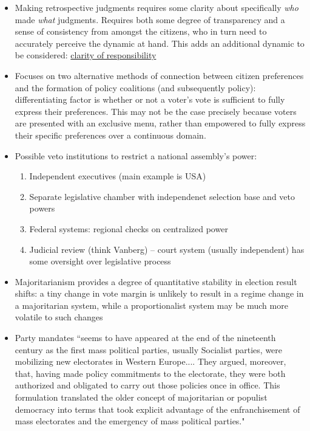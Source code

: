 \documentclass[12pt]{article}
\begin{document}
\begin{itemize}[leftmargin=*, itemsep=4pt]
    \item Making retrospective judgments requires some clarity about specifically \emph{who} made \emph{what} judgments. Requires both some degree of transparency and a sense of consistency from amongst the citizens, who in turn need to accurately perceive the dynamic at hand. This adds an additional dynamic to be considered: \underline{clarity of responsibility}
    \item Focuses on two alternative methods of connection between citizen preferences and the formation of policy coalitions (and subsequently policy): differentiating factor is whether or not a voter's vote is sufficient to fully express their preferences. This may not be the case precisely because voters are presented with an exclusive menu, rather than empowered to fully express their specific preferences over a continuous domain.
    \item Possible veto institutions to restrict a national assembly's power:
    \begin{enumerate}
        \item Independent executives (main example is USA)
        \item Separate legislative chamber with independenet selection base and veto powers
        \item Federal systems: regional checks on centralized power
        \item Judicial review (think Vanberg) -- court system (usually independent) has some oversight over legislative process
    \end{enumerate}
    \item Majoritarianism provides a degree of quantitative stability in election result shifts: a tiny change in vote margin is unlikely to result in a regime change in a majoritarian system, while a proportionalist system may be much more volatile to such changes
    \item Party mandates ``seems to have appeared at the end of the nineteenth century as the first mass political parties, usually Socialist parties, were mobilizing new electorates in Western Europe.... They argued, moreover, that, having made policy commitments to the electorate, they were both authorized and obligated to carry out those policies once in office. This formulation translated the older concept of majoritarian or populist democracy into terms that took explicit advantage of the enfranchisement of mass electorates and the emergency of mass political parties."

\end{itemize}
\end{document}
